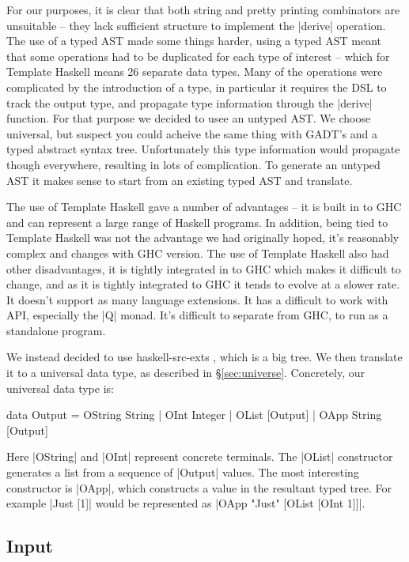 \documentclass[preprint]{sigplanconf}
\begin{document}
For our purposes, it is clear that both string and pretty printing combinators are unsuitable -- they lack sufficient structure to implement the |derive| operation. The use of a typed AST made some things harder, using a typed AST meant that some operations had to be duplicated for each type of interest -- which for Template Haskell means 26 separate data types. Many of the operations were complicated by the introduction of a type, in particular it requires the DSL to track the output type, and propagate type information through the |derive| function. For that purpose we decided to usee an untyped AST. We choose universal, but suspect you could acheive the same thing with GADT's and a typed abstract syntax tree. Unfortunately this type information would propagate though everywhere, resulting in lots of complication. To generate an untyped AST it makes sense to start from an existing typed AST and translate.

The use of Template Haskell gave a number of advantages -- it is built in to GHC and can represent a large range of Haskell programs. In addition, being tied to Template Haskell was not the advantage we had originally hoped, it's reasonably complex and changes with GHC version. The use of Template Haskell also had other disadvantages, it is tightly integrated in to GHC which makes it difficult to change, and as it is tightly integrated to GHC it tends to evolve at a slower rate. It doesn't support as many language extensions. It has a difficult to work with API, especially the |Q| monad. It's difficult to separate from GHC, to run as a standalone program.

We instead decided to use haskell-src-exts \cite{haskell_src_exts}, which is a big tree. We then translate it to a universal data type, as described in \S\ref{sec:universe}. Concretely, our universal data type is:

\begin{code}
data Output  =  OString String
             |  OInt Integer
             |  OList [Output]
             |  OApp String [Output]
\end{code}

Here |OString| and |OInt| represent concrete terminals. The |OList| constructor generates a list from a sequence of  |Output| values. The most interesting constructor is |OApp|, which constructs a value in the resultant typed tree. For example |Just [1]| would be represented as |OApp "Just" [OList [OInt 1]]|.

\subsection{Input}
\end{document}
